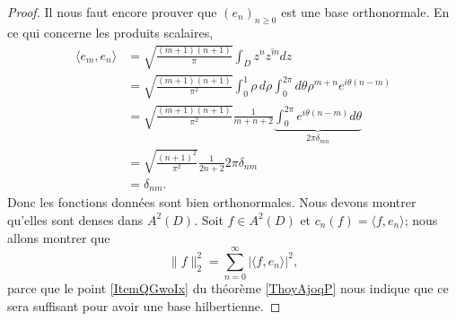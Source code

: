 \begin{proof}
    Il nous faut encore prouver que \( (e_n)_{n\geq 0}\) est une base orthonormale. En ce qui concerne les produits scalaires,
    \begin{subequations}
        \begin{align}
            \langle e_m, e_n\rangle &=\sqrt{\frac{ (m+1)(n+1) }{ \pi }}\int_Dz^n\overline{ z^m }dz\\
            &=\sqrt{\frac{ (m+1)(n+1) }{ \pi^2 }}\int_0^1\rho\,d\rho\int_0^{2\pi}d\theta \rho^{m+n} e^{i\theta(n-m)}\\
            &=\sqrt{\frac{ (m+1)(n+1) }{ \pi^2 }}\frac{1}{ m+n+2 }\underbrace{\int_{0}^{2\pi} e^{i\theta(n-m)}d\theta}_{2\pi \delta_{mn}}\\
            &=\sqrt{\frac{ (n+1)^2 }{ \pi^2 }}\frac{1}{ 2n+2 }2\pi \delta_{nm}\\
            &=\delta_{nm}.
        \end{align}
    \end{subequations}
    Donc les fonctions données sont bien orthonormales. Nous devons montrer qu'elles sont denses dans \( A^2(D)\). Soit \( f\in A^2(D)\) et \( c_n(f)=\langle f, e_n\rangle \); nous allons montrer que
    \begin{equation}
        \| f \|_2^2=\sum_{n=0}^{\infty}| \langle f, e_n\rangle  |^2,
    \end{equation}
    parce que le point \ref{ItemQGwoIx} du théorème \ref{ThoyAjoqP} nous indique que ce sera suffisant pour avoir une base hilbertienne.


\end{proof}
